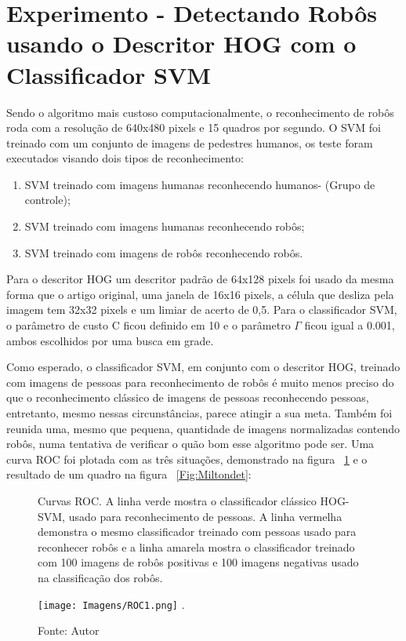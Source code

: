 \section{Experimento - Detectando Robôs usando o Descritor HOG com o Classificador SVM}
\label{exp:HOG-SVM}

Sendo o algoritmo mais custoso computacionalmente, o reconhecimento de robôs roda com a resolução de 640x480 pixels e 15 quadros por segundo. O SVM foi treinado com um conjunto de imagens de pedestres humanos, os teste foram executados visando dois tipos de reconhecimento:
\begin{enumerate}
	\item SVM treinado com imagens humanas reconhecendo humanos- (Grupo de controle);
	\item SVM treinado com imagens humanas reconhecendo robôs;
	\item SVM treinado com imagens de robôs reconhecendo robôs.
\end{enumerate}


Para o descritor HOG um descritor padrão de 64x128 pixels foi usado da mesma forma que o artigo original, uma janela de 16x16 pixels, a célula que desliza pela imagem tem 32x32 pixels e um limiar de acerto de 0,5. Para o classificador SVM, o parâmetro de custo C ficou definido em 10 e o parâmetro $\Gamma$ ficou igual a 0.001, ambos escolhidos por uma busca em grade.

Como esperado, o classificador SVM, em conjunto com o descritor HOG, treinado com imagens de pessoas para reconhecimento de robôs é muito menos preciso do que o reconhecimento clássico de imagens de pessoas reconhecendo pessoas, entretanto, mesmo nessas circunstâncias, parece atingir a sua meta. Também foi reunida uma, mesmo que pequena, quantidade de imagens normalizadas contendo robôs, numa tentativa de verificar o quão bom esse algoritmo pode ser. Uma curva ROC foi plotada com as três situações, demonstrado na figura ~\ref{Fig:ROC} e o resultado de um quadro na figura ~\ref{Fig:Miltondet}:

\begin{figure}[!h!t!]
\centering \caption{Curvas ROC. A linha verde mostra o classificador clássico HOG-SVM, usado para reconhecimento de pessoas.
A linha vermelha demonstra o mesmo classificador treinado com pessoas usado para reconhecer robôs e a linha amarela mostra o classificador treinado com 100 imagens de robôs positivas e 100 imagens negativas usado na classificação dos robôs.}
\texttt{[image: Imagens/ROC1.png]}
\DeclareGraphicsExtensions.
\caption*{Fonte: Autor }
\label{Fig:ROC}
\end{figure}


